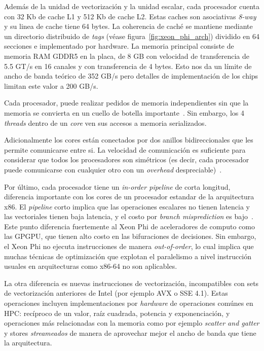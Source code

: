 Adem\'as de la unidad de vectorizaci\'on y la unidad escalar, cada procesador cuenta con 32 Kb de cache L1 y 512 Kb de cache
L2. Estas caches son asociativas \textit{8-way} y su linea de cache tiene 64 bytes. La coherencia de cach\'e se mantiene
mediante un directorio distribuido de \textit{tags} (v\'ease figura~\ref{fig:xeon_phi_arch}) dividido en 64 secciones e implementado
por hardware. La memoria principal consiste de memoria RAM GDDR5 en la placa, de 8 GB con velocidad de transferencia de 5.5 GT/s en 16 canales y con transferencia de 4
bytes. Esto nos da un l\'imite de ancho de banda te\'orico de 352 GB/s pero detalles de implementaci\'on de los chips limitan este valor a 200 GB/s.

Cada procesador, puede realizar pedidos de memoria independientes sin que la memoria se convierta en un cuello
de botella importante~\cite{Fang}. Sin embargo, los 4 \textit{threads} dentro de un \textit{core} ven sus accesos a memoria serializados.

Adicionalmente los cores est\'an conectados por dos anillos bidireccionales que les permite comunicarse entre si. La velocidad de
comunicaci\'on es suficiente para considerar que todos los procesadores son sim\'etricos (es decir, cada procesador puede comunicarse con
cualquier otro con un \textit{overhead} despreciable)~\cite{Fang}.

Por \'ultimo, cada procesador tiene un \textit{in-order pipeline} de corta longitud, diferencia importante con los cores de un procesador
estandar de la arquitectura x86. El \textit{pipeline} corto implica que las operaciones escalares no tienen latencia y las vectoriales tienen baja latencia,
y el costo por \textit{branch misprediction} es bajo~\cite{IntelXeonPhiWhitePaper}. Este punto diferencia fuertemente al Xeon Phi de aceleradores de computo como las GPGPU,
que tienen alto costo en las bifuraciones de decisiones. Sin embargo, el Xeon Phi no ejecuta instrucciones de manera \textit{out-of-order}, lo cual implica que muchas
t\'ecnicas de optimizaci\'on que explotan el paralelismo a nivel instrucci\'on usuales en arquitecturas como x86-64 no son aplicables.

La otra diferencia es nuevas instrucciones de vectorizaci\'on, incompatibles con sets de vectorizaci\'on anteriores de Intel (por ejemplo AVX o SSE 4.1).
Estas operaciones incluyen implementaciones por \textit{hardware} de operaciones com\'unes en HPC: rec\'iproco de un valor, ra\'iz cuadrada, potencia y
exponenciaci\'on, y operaciones m\'as relacionadas con la memoria como por ejemplo \textit{scatter and gatter} y stores \textit{streameados} de manera de aprovechar
mejor el ancho de banda que tiene la arquitectura.

